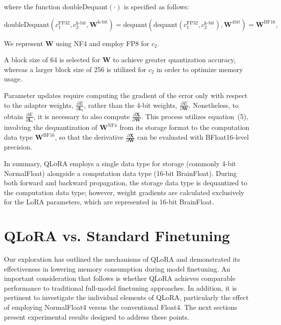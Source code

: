 where the function doubleDequant$(\cdot)$ is specified as follows:

\begin{equation}
    \text{doubleDequant}(c_1^{\text{FP32}}, c_2^{\text{k-bit}}, \mathbf{W}^{\text{k-bit}}) = \text{dequant}(\text{dequant}(c_1^{\text{FP32}}, c_2^{\text{k-bit}}), \mathbf{W}^{\text{4bit}}) = \mathbf{W}^{\text{BF16}},
\end{equation}

We represent $\mathbf{W}$ using NF4 and employ FP8 for $c_2$.

A block size of 64 is selected for $\mathbf{W}$ to achieve greater quantization accuracy, whereas a larger block size of 256 is utilized for $c_2$ in order to optimize memory usage.

Parameter updates require computing the gradient of the error only with respect to the adapter weights, $\frac{\partial E}{\partial \mathbf{L}_i}$, rather than the 4-bit weights, $\frac{\partial E}{\partial \mathbf{W}}$. Nonetheless, to obtain $\frac{\partial E}{\partial \mathbf{L}_i}$, it is necessary to also compute $\frac{\partial \mathbf{X}}{\partial \mathbf{W}}$. This process utilizes equation~(5), involving the dequantization of $\mathbf{W}^{\text{NF4}}$ from its storage format to the computation data type $\mathbf{W}^{\text{BF16}}$, so that the derivative $\frac{\partial \mathbf{X}}{\partial \mathbf{W}}$ can be evaluated with BFloat16-level precision.

In summary, \textsc{QLoRA} employs a single data type for storage (commonly 4-bit NormalFloat) alongside a computation data type (16-bit BrainFloat). During both forward and backward propagation, the storage data type is dequantized to the computation data type; however, weight gradients are calculated exclusively for the LoRA parameters, which are represented in 16-bit BrainFloat.

\section{QLoRA vs. Standard Finetuning}
\label{sec:comp_to_std}

Our exploration has outlined the mechanisms of QLoRA and demonstrated its effectiveness in lowering memory consumption during model finetuning. An important consideration that follows is whether QLoRA achieves comparable performance to traditional full-model finetuning approaches. In addition, it is pertinent to investigate the individual elements of QLoRA, particularly the effect of employing NormalFloat4 versus the conventional Float4. The next sections present experimental results designed to address these points.

